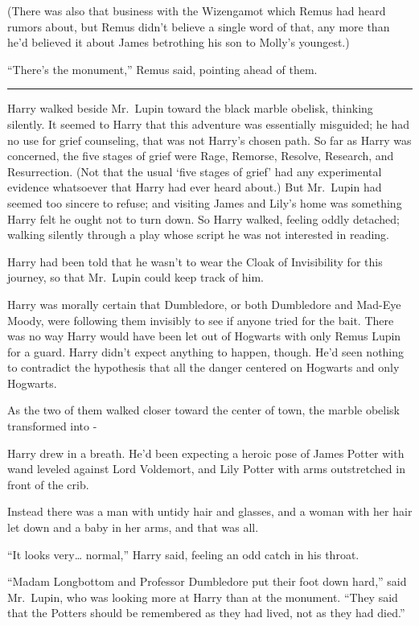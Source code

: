 (There was also that business with the Wizengamot which Remus had heard
rumors about, but Remus didn't believe a single word of that, any more
than he'd believed it about James betrothing his son to Molly's
youngest.)

``There's the monument,'' Remus said, pointing ahead of them.

\begin{center}\rule{3in}{0.4pt}\end{center}

Harry walked beside Mr.~Lupin toward the black marble obelisk, thinking
silently. It seemed to Harry that this adventure was essentially
misguided; he had no use for grief counseling, that was not Harry's
chosen path. So far as Harry was concerned, the five stages of grief
were Rage, Remorse, Resolve, Research, and Resurrection. (Not that the
usual `five stages of grief' had any experimental evidence whatsoever
that Harry had ever heard about.) But Mr.~Lupin had seemed too sincere
to refuse; and visiting James and Lily's home was something Harry felt
he ought not to turn down. So Harry walked, feeling oddly detached;
walking silently through a play whose script he was not interested in
reading.

Harry had been told that he wasn't to wear the Cloak of Invisibility for
this journey, so that Mr.~Lupin could keep track of him.

Harry was morally certain that Dumbledore, or both Dumbledore and
Mad-Eye Moody, were following them invisibly to see if anyone tried for
the bait. There was no way Harry would have been let out of Hogwarts
with only Remus Lupin for a guard. Harry didn't expect anything to
happen, though. He'd seen nothing to contradict the hypothesis that all
the danger centered on Hogwarts and only Hogwarts.

As the two of them walked closer toward the center of town, the marble
obelisk transformed into -

Harry drew in a breath. He'd been expecting a heroic pose of James
Potter with wand leveled against Lord Voldemort, and Lily Potter with
arms outstretched in front of the crib.

Instead there was a man with untidy hair and glasses, and a woman with
her hair let down and a baby in her arms, and that was all.

``It looks very\ldots{} normal,'' Harry said, feeling an odd catch in
his throat.

``Madam Longbottom and Professor Dumbledore put their foot down hard,''
said Mr.~Lupin, who was looking more at Harry than at the monument.
``They said that the Potters should be remembered as they had lived, not
as they had died.''

